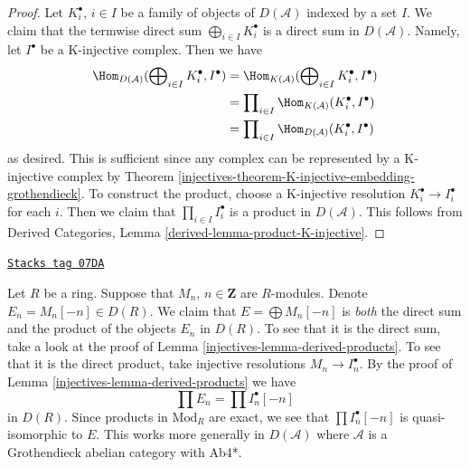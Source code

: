 \begin{proof}

Let $K^\bullet_i$, $i \in I$ be a family of objects of $D(\mathcal{A})$
indexed by a set $I$. We claim that the termwise direct sum
$\bigoplus_{i \in I} K^\bullet_i$ is a direct sum in $D(\mathcal{A})$.
Namely, let $I^\bullet$ be a K-injective complex. Then we have
\begin{align*}
\Hom_{D(\mathcal{A})}(\bigoplus\nolimits_{i \in I} K^\bullet_i, I^\bullet)
& =
\Hom_{K(\mathcal{A})}(\bigoplus\nolimits_{i \in I} K^\bullet_i, I^\bullet) \\
& =
\prod\nolimits_{i \in I} \Hom_{K(\mathcal{A})}(K^\bullet_i, I^\bullet) \\
& =
\prod\nolimits_{i \in I} \Hom_{D(\mathcal{A})}(K^\bullet_i, I^\bullet)
\end{align*}
as desired. This is sufficient since any complex can be represented
by a K-injective complex by
Theorem \ref{injectives-theorem-K-injective-embedding-grothendieck}.
To construct the product, choose a K-injective resolution
$K_i^\bullet \to I_i^\bullet$ for each $i$. Then we claim that
$\prod_{i \in I} I_i^\bullet$ is a product in $D(\mathcal{A})$.
This follows from
Derived Categories, Lemma \ref{derived-lemma-product-K-injective}.
\end{proof}

\begin{remark}
\label{injectives-remark-direct-sum-product-derived}
\href{https://stacks.math.columbia.edu/tag/07DA}{\texttt{Stacks tag 07DA}}

Let $R$ be a ring. Suppose that $M_n$, $n \in \mathbf{Z}$ are $R$-modules.
Denote $E_n = M_n[-n] \in D(R)$. We claim that $E = \bigoplus M_n[-n]$ is
{\it both} the direct sum and the product of the objects $E_n$ in $D(R)$.
To see that it is the direct sum, take a look at the proof of
Lemma \ref{injectives-lemma-derived-products}.
To see that it is the direct product, take injective resolutions
$M_n \to I_n^\bullet$. By the proof of
Lemma \ref{injectives-lemma-derived-products}
we have
$$
\prod E_n = \prod I_n^\bullet[-n]
$$
in $D(R)$. Since products in $\text{Mod}_R$ are exact, we see that
$\prod I_n^\bullet[-n]$ is quasi-isomorphic to $E$. This works more generally
in $D(\mathcal{A})$ where $\mathcal{A}$ is a Grothendieck abelian
category with Ab4*.
\end{remark}

